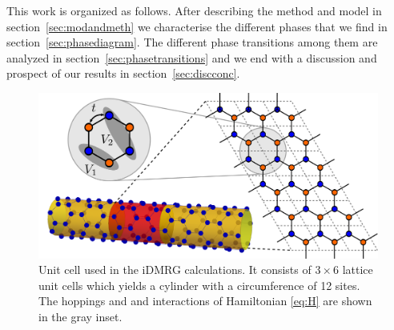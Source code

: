 \documentclass[aps,prx,10pt,twocolumn,floatfix,superscriptaddress,showpacs,numerical,footinbib]{revtex4-1}
\begin{document}
This work is organized as follows. 
%
After describing the method and model in section~\ref{sec:modandmeth} we
characterise the different phases that we find in section~\ref{sec:phasediagram}.
%
The different phase transitions among them are analyzed in section~\ref{sec:phasetransitions}
and we end with a discussion and prospect of our results in section~\ref{sec:discconc}.
%
\begin{figure}
%
 \includegraphics[width=\columnwidth]{pdf/unit_cell.pdf}
 \caption{Unit cell used in the iDMRG calculations. It consists of $3 \times 6$ lattice unit cells which yields a cylinder with a circumference of 12 sites. 
 The hoppings and and interactions of Hamiltonian \eqref{eq:H} are shown in the gray inset.  \label{fig:Defs}}
\end{figure}
\end{document}
